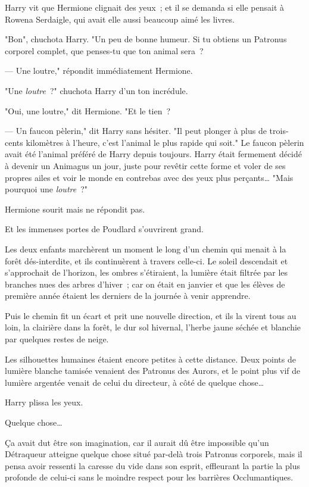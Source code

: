 Harry vit que Hermione clignait des yeux~; et il se demanda si elle pensait à Rowena Serdaigle, qui avait elle aussi beaucoup aimé les livres.

"Bon", chuchota Harry. "Un peu de bonne humeur. Si tu obtiens un Patronus corporel complet, que penses-tu que ton animal sera~?

--- Une loutre," répondit immédiatement Hermione.

"Une \emph{loutre}~?" chuchota Harry d'un ton incrédule.

"Oui, une loutre," dit Hermione. "Et le tien~?

--- Un faucon pèlerin," dit Harry sans hésiter. "Il peut plonger à plus de trois-cents kilomètres à l'heure, c'est l'animal le plus rapide qui soit." Le faucon pèlerin avait été l'animal préféré de Harry depuis toujours. Harry était fermement décidé à devenir un Animagus un jour, juste pour revêtir cette forme et voler de ses propres ailes et voir le monde en contrebas avec des yeux plus perçants… "Mais pourquoi une \emph{loutre}~?"

Hermione sourit mais ne répondit pas.

Et les immenses portes de Poudlard s'ouvrirent grand.

Les deux enfants marchèrent un moment le long d'un chemin qui menait à la forêt dés-interdite, et ils continuèrent à travers celle-ci. Le soleil descendait et s'approchait de l'horizon, les ombres s'étiraient, la lumière était filtrée par les branches nues des arbres d'hiver~; car on était en janvier et que les élèves de première année étaient les derniers de la journée à venir apprendre.

Puis le chemin fit un écart et prit une nouvelle direction, et ils la virent tous au loin, la clairière dans la forêt, le dur sol hivernal, l'herbe jaune séchée et blanchie par quelques restes de neige.

Les silhouettes humaines étaient encore petites à cette distance. Deux points de lumière blanche tamisée venaient des Patronus des Aurors, et le point plus vif de lumière argentée venait de celui du directeur, à côté de quelque chose…

Harry plissa les yeux.

Quelque chose…

Ça avait dut être son imagination, car il aurait dû être impossible qu'un Détraqueur atteigne quelque chose situé par-delà trois Patronus corporels, mais il pensa avoir ressenti la caresse du vide dans son esprit, effleurant la partie la plus profonde de celui-ci sans le moindre respect pour les barrières Occlumantiques.

